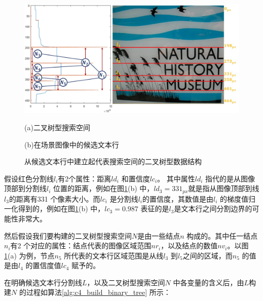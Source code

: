     \begin{figure}[!h]
    \centering
    \includegraphics[width=\textwidth]{./figures/c4_binary_tree_construction.jpg}
    \begin{minipage}[t]{0.40\linewidth}
    \centerline{\small (a)二叉树型搜索空间}
    \end{minipage}
    \begin{minipage}[t]{0.51\linewidth}
    \centerline{\small(b)在场景图像中的候选文本行}
    \end{minipage}
    \caption{从候选文本行中建立起代表搜索空间的二叉树型数据结构}
    \label{fig.c4_binary_tree_construction}
    \end{figure}

    假设红色分割线$l_i$有2个属性：距离$ld_i$ 和置信度$lc_i$。 其中属性$ld_i$ 指代的是从图像顶部到分割线$l_i$ 位置的距离，例如在图\ref{fig.c4_binary_tree_construction}(b) 中，$ld_3=331_{px}$就是指从图像顶部到线$l_3$的距离有331 个像素大小。而$lc_i$ 是分割线$l_i$的置信度，其数值是由$l_i$ 的梯度值归一化得到的，例如在图\ref{fig.c4_binary_tree_construction}(b) 中，$lc_3=0.987$ 表征的是$l_3$是文本行之间分割边界的可能性非常大。

    然后假设我们要构建的二叉树型搜索空间$N$是由一些结点$n$ 构成的。其中任一结点$n_i$有2 个对应的属性：结点代表的图像区域范围$nr_i$，以及结点的数值$nv_i$。以图\ref{fig.c4_binary_tree_construction}(a) 为例，节点$n_5$ 所代表的文本行区域范围是从线$l_3$ 到$l_5$之间的区域，而$n_5$ 的值是由$l_4$ 的置信度值$lc_4$ 赋予的。

    在明确候选文本行分割线$L$，以及二叉树型搜索空间$N$ 中各变量的含义后，由$L$构建$N$ 的过程如算法\ref{alg:c4_build_binary_tree} 所示：

